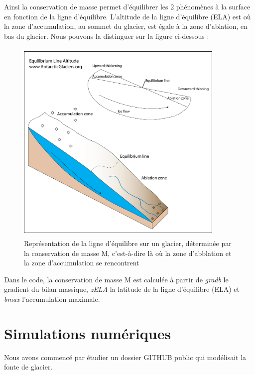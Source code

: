 \documentclass{article}
\begin{document}
\newpage
Ainsi la conservation de masse permet d'équilibrer les 2 phénomènes à la surface en fonction de la ligne d'équilibre. L'altitude de la ligne d'équilibre (ELA) est où la zone d'accumulation, au sommet du glacier, est égale à la zone d'ablation, en bas du glacier. Nous pouvons la distinguer sur la figure ci-dessous : 
\begin{figure}[!htpb]
\centering
\includegraphics[width=10cm, keepaspectratio=true, height=10cm]{equilibrium_line_altitude1.png}
\caption{Représentation de la ligne d'équilibre sur un glacier, déterminée par la conservation de masse M, c'est-à-dire là où la zone d'abblation et la zone d'accumulation se rencontrent}

\end{figure}



Dans le code, la conservation de masse M est calculée à partir de \textit{gradb} le gradient du bilan massique, \textit{zELA} la latitude de la ligne d'équilibre (ELA) et \textit{bmax} l'accumulation maximale.
\newpage
\section{Simulations numériques}

Nous avons commencé par étudier un dossier GITHUB public \cite{site2} qui modélisait la fonte de glacier.
\newline
\end{document}
